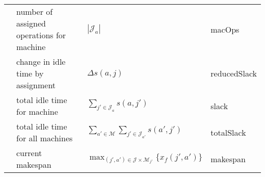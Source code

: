 \begin{tabular}{clll}
	\phimacOps       & number of assigned operations for machine & $|\mathcal{J}_a|$                                                                  & macOps       \\
	\phislotsReduced & change in idle time by assignment         & $\Delta 
	s(a,j)$                                                                    & 
	reducedSlack \\
	\phislots        & total idle time for machine               & $\sum_{j'\in 
	\mathcal{J}_a}s(a,j')$                                                & 
	slack        \\
	\phislotsTotal   & total idle time for all machines          & $\sum_{a'\in 
	\mathcal{M}}\sum_{j'\in \mathcal{J}_{a'}}s(a',j')$                    & 
	totalSlack   \\
	\phimakespan     & current makespan                          & 
	$\max_{(j',a')\in \mathcal{J} \times 
	\mathcal{M}_{j'}}\{x_f(j',a')\}$              & makespan     \\
	\bottomrule
\end{tabular}

